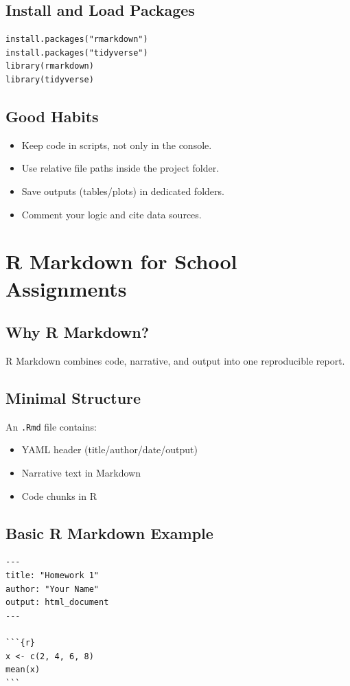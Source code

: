 \documentclass[11pt]{article}
\begin{document}
\subsection{Install and Load Packages}
\begin{verbatim}
install.packages("rmarkdown")
install.packages("tidyverse")
library(rmarkdown)
library(tidyverse)
\end{verbatim}

\subsection{Good Habits}
\begin{itemize}[leftmargin=*]
  \item Keep code in scripts, not only in the console.
  \item Use relative file paths inside the project folder.
  \item Save outputs (tables/plots) in dedicated folders.
  \item Comment your logic and cite data sources.
\end{itemize}

\section{R Markdown for School Assignments}
\subsection{Why R Markdown?}
R Markdown combines code, narrative, and output into one reproducible report.

\subsection{Minimal Structure}
An \texttt{.Rmd} file contains:
\begin{itemize}[leftmargin=*]
  \item YAML header (title/author/date/output)
  \item Narrative text in Markdown
  \item Code chunks in R
\end{itemize}

\subsection{Basic R Markdown Example}
\begin{verbatim}
---
title: "Homework 1"
author: "Your Name"
output: html_document
---

```{r}
x <- c(2, 4, 6, 8)
mean(x)
```
\end{verbatim}
\end{document}
